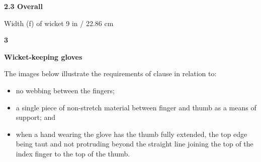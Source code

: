 \documentclass[12pt]{article}
\begin{document}
\vspace{\baselineskip}
{\fontsize{11pt}{13.2pt}\selectfont \textbf{2.3 \tabto{0.47in} Overall}\par}\par


\vspace{\baselineskip}
\begin{adjustwidth}{0.49in}{0.0in}
{\fontsize{9pt}{10.8pt}\selectfont Width (f) of wicket 9 in / 22.86 cm\par}\par

\end{adjustwidth}


\vspace{\baselineskip}
{\fontsize{16pt}{19.2pt}\selectfont \textbf{3 \tabto{0.29in} }{\fontsize{15pt}{18.0pt}\selectfont \textbf{Wicket-keeping gloves}\par}\par}\par


\vspace{\baselineskip}
{\fontsize{9pt}{10.8pt} \tabto{0.39in} The images below illustrate the requirements of clause in relation to:\par}\par


\vspace{\baselineskip}
\begin{itemize}
	\item {\fontsize{9pt}{10.8pt}\selectfont no webbing between the fingers;\par}\par


\vspace{\baselineskip}
	\item {\fontsize{9pt}{10.8pt}\selectfont a single piece of non-stretch material between finger and thumb as a means of support; and\par}\par


\vspace{\baselineskip}
	\item {\fontsize{9pt}{10.8pt}\selectfont when a hand wearing the glove has the thumb fully extended, the top edge being taut and not protruding beyond the straight line joining the top of the index finger to the top of the thumb.\par}
\end{itemize}\par
\end{document}
